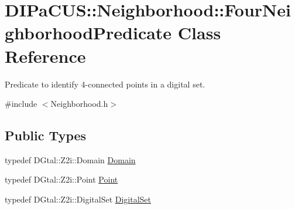\hypertarget{classDIPaCUS_1_1Neighborhood_1_1FourNeighborhoodPredicate}{}\section{D\+I\+Pa\+C\+US\+:\+:Neighborhood\+:\+:Four\+Neighborhood\+Predicate Class Reference}
\label{classDIPaCUS_1_1Neighborhood_1_1FourNeighborhoodPredicate}


Predicate to identify 4-\/connected points in a digital set.  




{\ttfamily \#include $<$Neighborhood.\+h$>$}

\subsection*{Public Types}
\begin{DoxyCompactItemize}
\item 
typedef D\+Gtal\+::\+Z2i\+::\+Domain \hyperlink{classDIPaCUS_1_1Neighborhood_1_1FourNeighborhoodPredicate_ad97cfd55062b2f95323031bd7c2b1860}{Domain}
\item 
typedef D\+Gtal\+::\+Z2i\+::\+Point \hyperlink{classDIPaCUS_1_1Neighborhood_1_1FourNeighborhoodPredicate_a5b162b7df8bf69ab1255dbee48de3298}{Point}
\item 
typedef D\+Gtal\+::\+Z2i\+::\+Digital\+Set \hyperlink{classDIPaCUS_1_1Neighborhood_1_1FourNeighborhoodPredicate_a9f81af73dae8303b1142e9ca6930c332}{Digital\+Set}
\end{DoxyCompactItemize}
